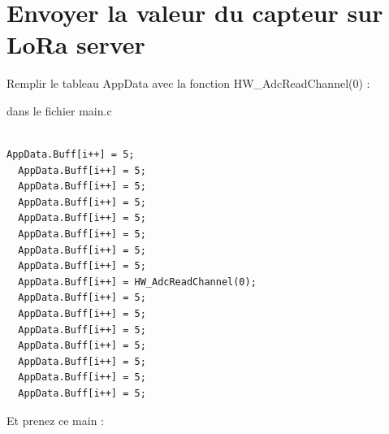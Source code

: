 \documentclass{article}
\begin{document}
\section{Envoyer la valeur du capteur sur LoRa server} 

Remplir le tableau AppData avec la fonction  HW\_AdcReadChannel(0) :

dans le fichier main.c 

\begin{verbatim}

AppData.Buff[i++] = 5;
  AppData.Buff[i++] = 5;
  AppData.Buff[i++] = 5;
  AppData.Buff[i++] = 5;
  AppData.Buff[i++] = 5;
  AppData.Buff[i++] = 5;
  AppData.Buff[i++] = 5;
  AppData.Buff[i++] = 5;
  AppData.Buff[i++] = HW_AdcReadChannel(0);
  AppData.Buff[i++] = 5;
  AppData.Buff[i++] = 5;
  AppData.Buff[i++] = 5;
  AppData.Buff[i++] = 5;
  AppData.Buff[i++] = 5;
  AppData.Buff[i++] = 5;
  AppData.Buff[i++] = 5;

\end{verbatim}

Et prenez ce main :
\end{document}
